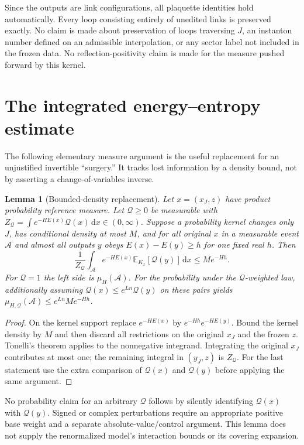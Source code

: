 \documentclass[11pt]{article}
\newtheorem{lemma}[theorem]{Lemma}
\theoremstyle{definition}
\theoremstyle{remark}
\newcommand{\E}{\mathbb E}
\newcommand{\dd}{\,\mathrm d}
\begin{document}
Since the outputs are link configurations, all plaquette identities hold
automatically. Every loop consisting entirely of unedited links is
preserved exactly. No claim is made about preservation of loops traversing
$J$, an instanton number defined on an admissible interpolation, or any
sector label not included in the frozen data. No reflection-positivity
claim is made for the measure pushed forward by this kernel.

\section{The integrated energy--entropy estimate}
The following elementary measure argument is the useful replacement for
an unjustified invertible ``surgery.'' It tracks lost information by a
density bound, not by asserting a change-of-variables inverse.

\begin{lemma}[Bounded-density replacement]\label{lem:integrated}
Let $x=(x_J,z)$ have product probability reference measure. Let
$\mathcal Q\ge0$ be measurable with
$Z_{\mathcal Q}=\int e^{-HE(x)}\mathcal Q(x)\dd x\in(0,\infty)$.
Suppose a probability kernel changes only $J$, has conditional density
at most $M$, and for all original $x$ in a measurable event $\mathcal A$
and almost all outputs $y$ obeys
$E(x)-E(y)\ge h$ for one fixed real $h$. Then
\begin{equation}
 \frac1{Z_{\mathcal Q}}
 \int_{\mathcal A}e^{-HE(x)}
       \E_{K_x}[\mathcal Q(y)]\dd x\le M e^{-Hh}.
 \label{eq:integrated}
\end{equation}
For $\mathcal Q=1$ the left side is $\mu_H(\mathcal A)$.
For the probability under the $\mathcal Q$-weighted law, additionally
assuming $\mathcal Q(x)\le e^{Ln}\mathcal Q(y)$ on these pairs yields
$\mu_{H,\mathcal Q}(\mathcal A)\le e^{Ln}M e^{-Hh}$.
\end{lemma}
\begin{proof}
On the kernel support replace $e^{-HE(x)}$ by
$e^{-Hh}e^{-HE(y)}$. Bound the kernel density by $M$ and then discard
all restrictions on the original $x_J$ and the frozen $z$. Tonelli's
theorem applies to the nonnegative integrand. Integrating the original
$x_J$ contributes at most one; the remaining integral in $(y_J,z)$ is
$Z_{\mathcal Q}$. For the last statement use the extra comparison of
$\mathcal Q(x)$ and $\mathcal Q(y)$ before applying the same argument.
\end{proof}
No probability claim for an arbitrary $\mathcal Q$ follows by silently
identifying $\mathcal Q(x)$ with $\mathcal Q(y)$. Signed or complex
perturbations require an appropriate positive base weight and a separate
absolute-value/control argument. This lemma does not supply the
renormalized model's interaction bounds or its covering expansion.
\end{document}
